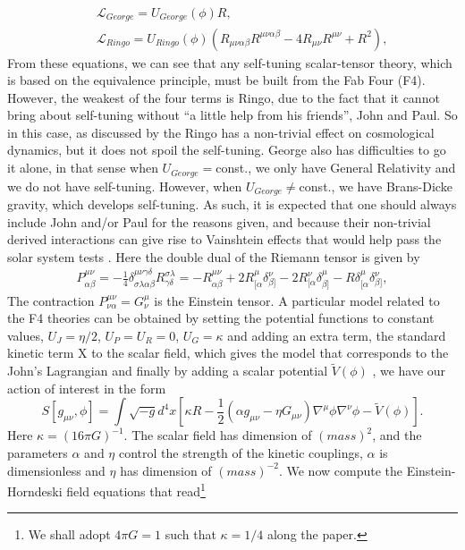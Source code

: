 \documentclass[aps,12pt, a4paper,nofootinbib]{revtex4}
\begin{document}
{{\begin{eqnarray}
&&\mathcal{L}_{George}=U_{George}(\phi)R,\\
&&\mathcal{L}_{Ringo}=U_{Ringo}(\phi)(R_{\mu\nu\alpha\beta}R^{\mu\nu\alpha\beta}-4R_{\mu\nu }R^{\mu\nu}+R^{2}),
\end{eqnarray}
From these equations, we can see that any self-tuning scalar-tensor theory, which is based on the equivalence principle, must be built from the Fab Four (F4). However, the weakest of the four terms is Ringo, due to the fact that it cannot bring about self-tuning without ``a little help from his friends'', John and Paul. So in this case, as discussed by \cite{Charmousis:2011bf,Charmousis:2011ea} the Ringo has a non-trivial effect on cosmological dynamics, but it does not spoil the self-tuning. George also has difficulties to go it alone, in that sense when $U_{George}=$const., we only have General Relativity and we do not have self-tuning. However, when $U_{George}\neq$const., we have Brans-Dicke gravity, which develops self-tuning. As such, it is expected that one should always include John and/or Paul for the reasons given, and because their non-trivial derived interactions can give rise to Vainshtein effects that would help pass the solar system tests \cite{Charmousis:2011bf}. Here the double dual of the Riemann tensor is given by
\begin{eqnarray}
P^{\mu\nu}_{\alpha\beta}=-\frac{1}{4}\delta^{\mu\nu\gamma\delta}_{\sigma\lambda\alpha\beta}R ^{\sigma\lambda}_{\gamma\delta}=-R^{\mu\nu}_{\alpha\beta}+2R^{\mu}_{[\alpha}\delta^{\nu }_{\beta ]}-2R^{\nu}_{[\alpha}\delta^{\mu}_{\beta ]}-R\delta^{\mu}_{[\alpha}\delta ^{\nu}_{\beta ]},
\end{eqnarray}
The contraction $P^{\mu\nu}_{\nu\alpha}=G^{\mu}_{\nu}$ is the Einstein tensor. A particular model related to the F4 theories can be obtained by setting the potential functions to constant values, $U_{J}=\eta/2$, $U_{P}=U_{R}=0$, $U_{G} =\kappa$ and adding an extra term, the standard kinetic term X to the scalar field, which gives the model that corresponds to the John's Lagrangian \cite{Starobinsky:2016kua} and finally by adding a scalar potential $\tilde{V}(\phi)$ \cite{Charmousis:2011bf,Charmousis:2011ea,Babichev:2017lmw,Starobinsky:2016kua,Bruneton:2012zk}, we have our action of interest in the form}
\begin{equation}
S[g_{\mu\nu},\phi]=\int{\sqrt{-g}d^{4}x\left[\kappa R-\frac{1}{2}(\alpha g_{\mu\nu}-\eta G_{\mu\nu})\nabla^{\mu}\phi\nabla^{\nu}\phi-\tilde{V}(\phi)\right]}.\label{1}
\end{equation}
Here $\kappa=(16\pi G)^{-1}$. The scalar field has dimension of $(mass)^{2}$, and the parameters $\alpha$ and $\eta$ control the strength of the kinetic couplings, $\alpha$ is dimensionless and $\eta$ has dimension of $(mass)^{-2}$. We now compute the Einstein-Horndeski field equations that read\footnote{We shall adopt $4\pi G=1$ such that $\kappa=1/4$ along the paper.} 
}
\end{document}

